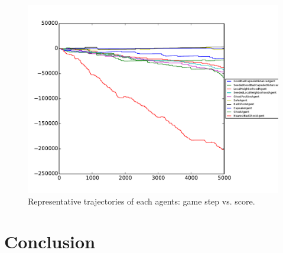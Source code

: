 \documentclass[11pt]{amsart}
\begin{document}
\begin{figure}
	\includegraphics[width=\textwidth]{agents-trajectories.pdf}
	\caption{Representative trajectories of each agents: game step vs. score.}
\end{figure}


\section{Conclusion}
\end{document}
